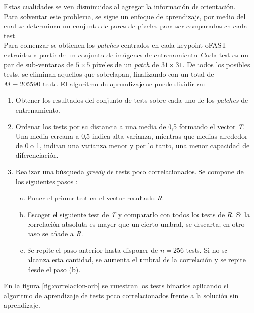 Estas cualidades se ven disminuidas al agregar la información de orientación. Para solventar este problema, se sigue un enfoque de aprendizaje, por medio del cual se determinan un conjunto de pares de píxeles para ser comparados en cada test. \\
Para comenzar se obtienen los \textit{patches} centrados en cada keypoint oFAST extraídos a partir de un conjunto de imágenes de entrenamiento. Cada test es un par de sub-ventanas de $5 \times 5$ píxeles de un \textit{patch} de $31 \times 31$. De todos los posibles tests, se eliminan aquellos que sobrelapan, finalizando con un total de $M = 205590$ tests.
El algoritmo de aprendizaje se puede dividir en:

\begin{enumerate}

\item Obtener los resultados del conjunto de tests sobre cada uno de los \textit{patches} de entrenamiento.

\item Ordenar los tests por su distancia a una media de 0,5 formando el vector \textit{T}. Una media cercana a 0,5 indica alta varianza, mientras que medias alrededor de 0 o 1, indican una varianza menor y por lo tanto, una menor capacidad de diferenciación.

\item Realizar una búsqueda \textit{greedy} de tests poco correlacionados. Se compone de los siguientes pasos :
\begin{enumerate} [a)]
\item Poner el primer test en el vector resultado \textit{R}.

\item Escoger el siguiente test de \textit{T} y compararlo con todos los tests de \textit{R}. Si la correlación absoluta es mayor que un cierto umbral, se descarta; en otro caso se añade a \textit{R}.

\item Se repite el paso anterior hasta disponer de $n = 256$ tests. Si no se alcanza esta cantidad, se aumenta el umbral de la correlación y se repite desde el paso (b).
\end{enumerate}

\end{enumerate}

En la figura \ref{fig:correlacion-orb} se muestran los tests binarios aplicando el algoritmo de aprendizaje de tests poco correlacionados frente a la solución sin aprendizaje.

